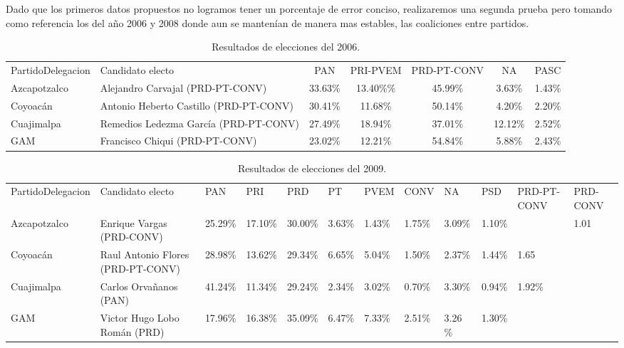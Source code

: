 Dado que los primeros datos propuestos no logramos tener un porcentaje de error conciso, realizaremos una segunda prueba pero tomando como referencia los del año 2006 y 2008 donde aun se mantenían de manera mas estables, las coaliciones entre partidos. 

\begin{table}[h]
\centering
\resizebox{15cm}{!} {
\begin{tabular}{m{2.5cm}m{3cm}ccccc}
\rowcolor[HTML]{3166FF} 
{\color[HTML]{FFFFFF} Partido\newline Delegacion} & {\color[HTML]{FFFFFF} Candidato electo} & {\color[HTML]{FFFFFF} PAN} & {\color[HTML]{FFFFFF} PRI-PVEM} & {\color[HTML]{FFFFFF} PRD-PT-CONV} & {\color[HTML]{FFFFFF} NA} & {\color[HTML]{FFFFFF} PASC} \\
Azcapotzalco & Alejandro Carvajal (PRD-PT-CONV) & 33.63\% & 13.40\%\% & 45.99\% & 3.63\% & 1.43\% \\
Coyoacán & Antonio Heberto Castillo (PRD-PT-CONV) & 30.41\% & 11.68\% & 50.14\% & 4.20\% & 2.20\% \\
Cuajimalpa & Remedios Ledezma García (PRD-PT-CONV) & 27.49\% & 18.94\% & 37.01\% & 12.12\% & 2.52\% \\
GAM & Francisco Chiqui (PRD-PT-CONV) & 23.02\% & 12.21\% & 54.84\% & 5.88\% & 2.43\%
\end{tabular}
}
\caption{Resultados de elecciones del 2006. \cite{IECM2006}}
\label{table:Elecciones2006}
\end{table}

\begin{table}[h]
\centering
\resizebox{15cm}{!} {
\begin{tabular}{m{2.5cm}m{3cm}llllllllm{2cm}m{2cm}}
\rowcolor[HTML]{3166FF} 
{\color[HTML]{FFFFFF} Partido\newline Delegacion} & {\color[HTML]{FFFFFF} Candidato electo} & {\color[HTML]{FFFFFF} PAN} & {\color[HTML]{FFFFFF} PRI} & {\color[HTML]{FFFFFF} PRD} & {\color[HTML]{FFFFFF} PT} & {\color[HTML]{FFFFFF} PVEM} & {\color[HTML]{FFFFFF} CONV} & {\color[HTML]{FFFFFF} NA} & {\color[HTML]{FFFFFF} PSD} & {\color[HTML]{FFFFFF} PRD-PT-CONV} & {\color[HTML]{FFFFFF} PRD-CONV} \\
Azcapotzalco & Enrique Vargas (PRD-CONV) & 25.29\% & 17.10\% & 30.00\% & 3.63\% & 1.43\% & 1.75\% & 3.09\% & 1.10\% &  & 1.01 \\
Coyoacán & Raul Antonio Flores (PRD-PT-CONV) & 28.98\% & 13.62\% & 29.34\% & 6.65\% & 5.04\% & 1.50\% & 2.37\% & 1.44\% & 1.65 &  \\
Cuajimalpa & Carlos Orvañanos (PAN) & 41.24\% & 11.34\% & 29.24\% & 2.34\% & 3.02\% & 0.70\% & 3.30\% & 0.94\% & 1.92\% &  \\
GAM & Victor Hugo Lobo Román (PRD) & 17.96\% & 16.38\% & 35.09\% & 6.47\% & 7.33\% & 2.51\% & 3.26 \%& 1.30\% &  & 
\end{tabular}
}
\caption{Resultados de elecciones del 2009. \cite{IEDF2009}}
\label{table:Elecciones2015}
\end{table}

